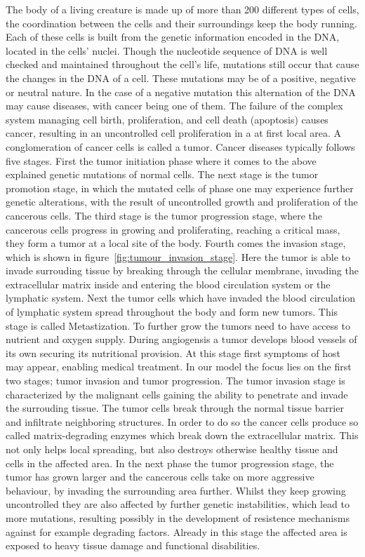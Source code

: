 The body of a living creature is made up of more than 200 different types of cells, the coordination between the cells and their surroundings keep the body running. Each of these cells is built from the genetic information encoded in the DNA, located in the cells' nuclei. Though the nucleotide sequence of DNA is well checked and maintained throughout the cell's life, mutations still occur that cause the changes in the DNA of a cell. These mutations may be of a positive, negative or neutral nature. In the case of a negative mutation this alternation of the DNA may cause diseases, with cancer being one of them. The failure of the complex system managing cell birth, proliferation, and cell death (apoptosis) causes cancer, resulting in an uncontrolled cell proliferation in a at first local area. A conglomeration of cancer cells is called a tumor. \newline
Cancer diseases typically follows five stages. First the tumor initiation phase where it comes to the above explained genetic mutations of normal cells. The next stage is the tumor promotion stage, in which the mutated cells of phase one may experience further genetic alterations, with the result of uncontrolled growth and proliferation of the cancerous cells. The third stage is the tumor progression stage, where the cancerous cells progress in growing and proliferating, reaching a critical mass, they form a tumor at a local site of the body. Fourth comes the invasion stage, which is shown in figure~\ref{fig:tumour_invasion_stage}. Here the tumor is able to invade surrouding tissue by breaking through the cellular membrane, invading the extracellular matrix inside and entering the blood circulation system or the lymphatic system. Next the tumor cells which have invaded the blood circulation of lymphatic system spread throughout the body and form new tumors. This stage is called Metastization. To further grow the tumors need to have access to nutrient and oxygen supply. During angiogensis a tumor develops blood vessels of its own securing its nutritional provision. At this stage first symptoms of host may appear, enabling medical treatment.\newline
In our model the focus lies on the first two stages; tumor invasion and tumor progression. The tumor invasion stage is characterized by the malignant cells gaining the ability to penetrate and invade the surrouding tissue. The tumor cells break through the normal tissue barrier and infiltrate neighboring structures. In order to do so the cancer cells produce so called matrix-degrading enzymes which break down the extracellular matrix. This not only helps local spreading, but also destroys otherwise healthy tissue and cells in the affected area. In the next phase the tumor progression stage, the tumor has grown larger and the cancerous cells take on more aggressive behaviour, by invading the surrounding area further. Whilst they keep growing uncontrolled they are also affected by further genetic instabilities, which lead to more mutations, resulting possibly in the development of resistence mechanisms against for example degrading factors. Already in this stage the affected area is exposed to heavy tissue damage and functional disabilities.\newline
